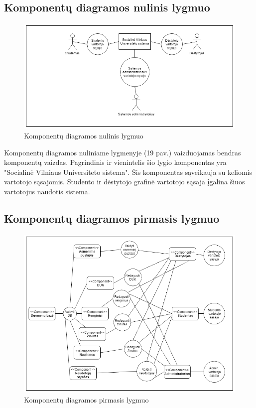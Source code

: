 \documentclass{VUMIFPSkursinis}
\begin{document}
\subsection{Komponentų diagramos nulinis lygmuo}

\begin{figure}[H]
	\centering
	\includegraphics[width=\linewidth]{img/0lygmuo.png}
	\caption{Komponentų diagramos nulinis lygmuo}
	\label{fig:0lygmuo}
\end{figure}

Komponentų diagramos nuliniame lygmenyje (19 pav.) vaizduojamas bendras komponentų vaizdas. Pagrindinis ir vienintelis šio lygio komponentas yra "Socialinė Vilniaus Universiteto sistema". Šis komponentas sąveikauja su keliomis vartotojo sąsajomis. Studento ir dėstytojo grafinė vartotojo sąsaja įgalina šiuos vartotojus naudotis sistema.

\subsection{Komponentų diagramos pirmasis lygmuo}

\begin{figure}[H]
	\centering
	\includegraphics[width=\linewidth]{img/1lygmuo.png}
	\caption{Komponentų diagramos pirmasis lygmuo}
	\label{fig:0lygmuo}
\end{figure}
\end{document}

